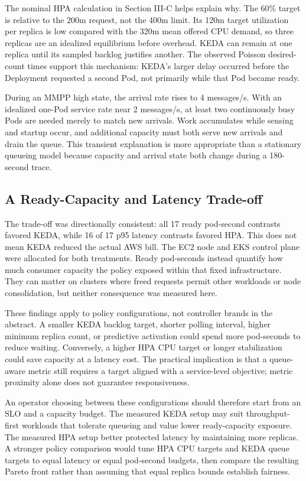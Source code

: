 \documentclass[conference]{IEEEtran}
\begin{document}
The nominal HPA calculation in Section III-C helps explain why. The 60\% target
is relative to the 200m request, not the 400m limit. Its 120m target utilization
per replica is low compared with the 320m mean offered CPU demand, so three
replicas are an idealized equilibrium before overhead. KEDA can remain at one
replica until its sampled backlog justifies another. The observed Poisson
desired-count times support this mechanism: KEDA's larger delay occurred before
the Deployment requested a second Pod, not primarily while that Pod became
ready.

During an MMPP high state, the arrival rate rises to 4 messages/s. With an
idealized one-Pod service rate near 2 messages/s, at least two continuously busy
Pods are needed merely to match new arrivals. Work accumulates while sensing and
startup occur, and additional capacity must both serve new arrivals and drain
the queue. This transient explanation is more appropriate than a stationary
queueing model because capacity and arrival state both change during a
180-second trace.

\subsection{A Ready-Capacity and Latency Trade-off}

The trade-off was directionally consistent: all 17 ready pod-second contrasts
favored KEDA, while 16 of 17 p95 latency contrasts favored HPA. This does not
mean KEDA reduced the actual AWS bill. The EC2 node and EKS control plane were
allocated for both treatments. Ready pod-seconds instead quantify how much
consumer capacity the policy exposed within that fixed infrastructure. They can
matter on clusters where freed requests permit other workloads or node
consolidation, but neither consequence was measured here.

These findings apply to policy configurations, not controller brands in the
abstract. A smaller KEDA backlog target, shorter polling interval, higher
minimum replica count, or predictive activation could spend more pod-seconds to
reduce waiting. Conversely, a higher HPA CPU target or longer stabilization
could save capacity at a latency cost. The practical implication is that a
queue-aware metric still requires a target aligned with a service-level
objective; metric proximity alone does not guarantee responsiveness.

An operator choosing between these configurations should therefore start from
an SLO and a capacity budget. The measured KEDA setup may suit throughput-first
workloads that tolerate queueing and value lower ready-capacity exposure. The
measured HPA setup better protected latency by maintaining more replicas. A
stronger policy comparison would tune HPA CPU targets and KEDA queue targets to
equal latency or equal pod-second budgets, then compare the resulting Pareto
front rather than assuming that equal replica bounds establish fairness.
\end{document}
